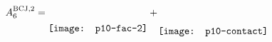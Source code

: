 \documentclass{standalone}
\begin{document}
$
A_6^{\text{BCJ},2}=\raisebox{-5.5mm}{\texttt{[image: p10-fac-2]}}+\hspace*{-0.05cm}\raisebox{-6.5mm}{\texttt{[image: p10-contact]}}
$
\end{document}
